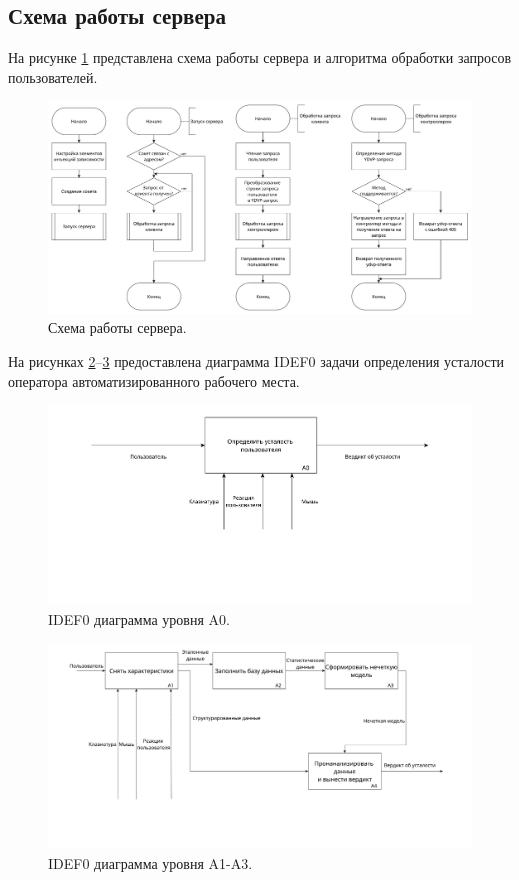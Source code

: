 \subsection{Схема работы сервера}

На рисунке \ref{fig:serverWork} представлена схема работы сервера и алгоритма обработки запросов пользователей.

\begin{figure}[H]
	\centering
	\includegraphics[width=\textwidth]{img/serverWorkScheme.pdf}
	\caption{Схема работы сервера.}
	\label{fig:serverWork}
\end{figure}

На рисунках \ref{fig:idef:0}--\ref{fig:idef:1} предоставлена диаграмма IDEF0 задачи определения усталости оператора автоматизированного рабочего места.

\begin{figure}[H]
	\centering
	\includegraphics[width=\textwidth]{img/A0.pdf}
	\caption{IDEF0 диаграмма уровня A0.}
	\label{fig:idef:0}
\end{figure}

\begin{figure}[H]
	\centering
	\includegraphics[width=\textwidth]{img/A123.pdf}
	\caption{IDEF0 диаграмма уровня A1-A3.}
	\label{fig:idef:1}
\end{figure}

